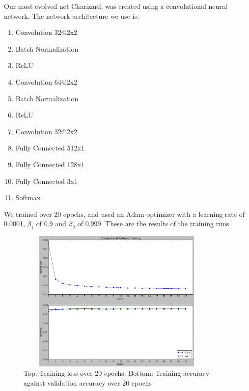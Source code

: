 

Our most evolved net Charizard, was created using a convolutional neural network.
The network architecture we use is:
\begin{enumerate}
    \item Convolution 32@2x2
    \item Batch Normalization
    \item ReLU
    \item Convolution 64@2x2
    \item Batch Normalization
    \item ReLU
    \item Convolution 32@2x2
    \item Fully Connected 512x1
    \item Fully Connected 128x1
    \item Fully Connected 3x1
    \item Softmax
\end{enumerate}
We trained over 20 epochs, and used an Adam optimizer with a learning rate of 0.0001, $\beta_1$ of 0.9 and $\beta_2$ of 0.999.
These are the results of the training runs
\begin{figure}[h!]
	\centering
	\includegraphics[width=10cm, height=7cm]{convolutional-net-training.png}
	\caption{Top: Training loss over 20 epochs. Bottom: Training accuracy against validation accuracy over 20 epochs}
	\label{fig:conv_net}
\end{figure}

